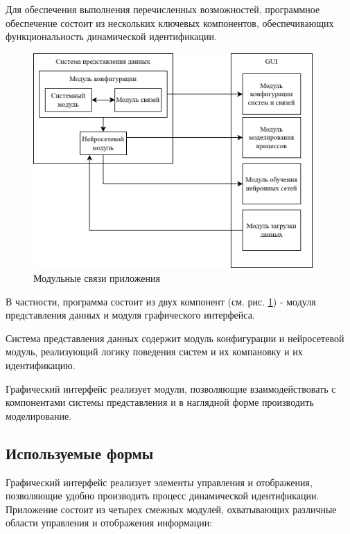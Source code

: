 Для обеспечения выполнения перечисленных возможностей, программное обеспечение
состоит из нескольких ключевых компонентов, обеспечивающих функциональность
динамической идентификации. 

\begin{figure}[H]
  \begin{center}
    \includegraphics[width=0.95\textwidth]{figures/modules/relations.png}
  \end{center}
  \caption{Модульные связи приложения}\label{fig:modules:relation}
\end{figure}

В частности, программа состоит из двух компонент (см. рис.
\ref{fig:modules:relation}) - модуля представления данных и модуля графического
интерфейса. 

Система представления данных содержит модуль конфигурации и нейросетевой
модуль, реализующий логику поведения систем и их компановку и их идентификацию.

Графический интерфейс реализует модули, позволяющие взаимодействовать с
компонентами системы представления и в наглядной форме производить
моделирование. 

\subsection{Используемые формы}

Графический интерфейс реализует элементы управления и отображения, позволяющие
удобно производить процесс динамической идентификации. Приложение состоит из
четырех смежных модулей, охватывающих различные области управления и
отображения информации:

